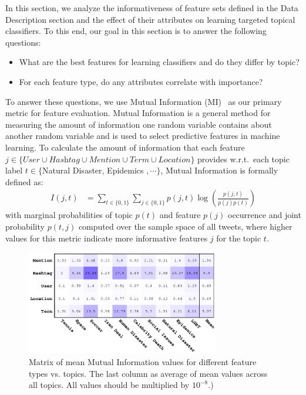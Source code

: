 In this section, we analyze the informativeness of feature sets defined in the Data Description section and the effect of their
attributes on learning targeted topical classifiers. To this end,
our goal in this section is to answer the following questions:
\begin{itemize}
\item What are the best features for learning classifiers and do they differ by topic?
\item For each feature type, do any attributes correlate with importance?
\end{itemize}
To answer these questions, we use Mutual Information (MI)~\cite{manning_ir} as our primary
metric for feature evaluation.  Mutual Information is a general method
for measuring the amount of information one random variable contains
about another random variable and is used to select
predictive features in machine learning.  To calculate the amount of
information that each feature
$j \in \{ \textit{User} \cup \textit{Hashtag} \cup \textit{Mention} \cup \textit{Term} \cup \textit{Location} \}$
provides w.r.t.\ each topic label $t \in \{$Natural Disaster, Epidemics $,\cdots\}$,
Mutual Information is formally defined as:
\begin{align*}
I(j, t) & = \!\!\! \sum_{t \in \{ \mathrm{0}, \mathrm{1} \}} \sum_{j \in \{ \mathrm{0}, \mathrm{1}\}}p(j,t)\log \left ( \frac{p(j,t)}{p(j)p(t)} \right ) 
 \label{eq:eq1}
\end{align*}
with marginal probabilities of topic $p(t)$ and feature $p(j)$ occurrence and joint probability $p(t,j)$ computed over the sample space of all tweets, 
where higher values for this metric indicate more informative features $j$ for the topic $t$.




\begin{figure}[t!]
\centering
\includegraphics[width=0.75\textwidth]{images/avgMI_gray}%
\caption{Matrix of mean Mutual Information values for different feature types vs. topics.  The last column as average of mean values across all topics.  All values should be multiplied by $10^{-8}$.)}
\label{fig:avgMI}
\end{figure}

